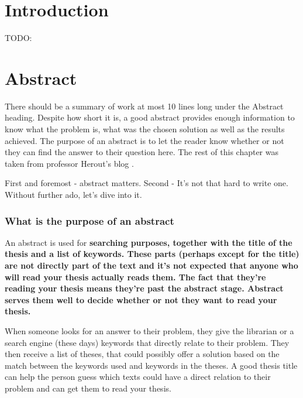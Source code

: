 
% 

\chapter{Introduction}

TODO: 



\chapter{Abstract}
\label{abstrakt}

There should be a summary of work at most 10 lines long under the Abstract heading. Despite how short it is, a good abstract provides enough information to know what the problem is, what was the chosen solution as well as the results achieved. The purpose of an abstract is to let the reader know whether or not they can find the answer to their question here. The rest of this chapter was taken from professor Herout's blog \cite{Herout}.
\bigskip

\noindent First and foremost - abstract matters. Second - It's not that hard to write one. Without further ado, let's dive into it.

\subsection*{What is the purpose of an abstract}
An abstract is used for \bf searching \rm purposes, together with the title of the thesis and a list of keywords. These parts (perhaps except for the title) are not directly part of the text and it's not expected that anyone who will read your thesis actually reads them. The fact that they're reading your thesis means they're past the abstract stage. Abstract serves them well to decide \bf whether or not \rm they want to read your thesis.

When someone looks for an answer to their problem, they give the librarian or a search engine (these days) keywords that directly relate to their problem. They then receive a list of theses, that could possibly offer a solution based on the match between the keywords used and keywords in the theses. A good thesis title can help the person guess which texts could have a direct relation to their problem and can get them to read your thesis.

